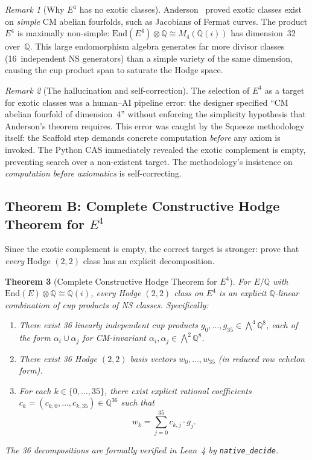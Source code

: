 \documentclass[11pt]{article}
\theoremstyle{plain}
\newtheorem{theorem}{Theorem}[section]
\theoremstyle{definition}
\theoremstyle{remark}
\newtheorem{remark}[theorem]{Remark}
\newcommand{\Q}{\mathbb{Q}}
\newcommand{\End}{\mathrm{End}}
\begin{document}
\begin{remark}[Why $E^4$ has no exotic classes]\label{rem:why-no-exotic}
Anderson~\cite{Anderson1993} proved exotic classes exist on
\emph{simple} CM abelian fourfolds, such as Jacobians of Fermat
curves.  The product $E^4$ is maximally non-simple:
$\End(E^4) \otimes \Q \cong M_4(\Q(i))$ has dimension~32 over~$\Q$.
This large endomorphism algebra generates far more divisor classes
(16~independent NS generators) than a simple variety of the same
dimension, causing the cup product span to saturate the Hodge space.
\end{remark}

\begin{remark}[The hallucination and self-correction]%
\label{rem:hallucination}
The selection of $E^4$ as a target for exotic classes was a
human--AI pipeline error: the designer specified ``CM abelian
fourfold of dimension~4'' without enforcing the simplicity
hypothesis that Anderson's theorem requires.  This error was
caught by the Squeeze methodology itself: the Scaffold step
demands concrete computation \emph{before} any axiom is invoked.
The Python CAS immediately revealed the exotic complement is
empty, preventing search over a non-existent target.  The
methodology's insistence on \emph{computation before axiomatics}
is self-correcting.
\end{remark}

\subsection{Theorem B: Complete Constructive Hodge Theorem for $E^4$}

Since the exotic complement is empty, the correct target is
stronger: prove that \emph{every} Hodge $(2,2)$ class has
an explicit decomposition.

\begin{theorem}[Complete Constructive Hodge Theorem for $E^4$]%
\label{thm:constructive-hodge}
For $E/\Q$ with $\End(E) \otimes \Q \cong \Q(i)$, every
Hodge $(2,2)$ class on $E^4$ is an explicit $\Q$-linear
combination of cup products of NS classes.  Specifically:
\begin{enumerate}[nosep]
\item There exist 36 linearly independent cup products
  $g_0, \ldots, g_{35} \in \bigwedge^4 \Q^8$, each of the
  form $\alpha_i \cup \alpha_j$ for CM-invariant
  $\alpha_i, \alpha_j \in \bigwedge^2 \Q^8$.
\item There exist 36 Hodge $(2,2)$ basis vectors
  $w_0, \ldots, w_{35}$ (in reduced row echelon form).
\item For each $k \in \{0, \ldots, 35\}$, there exist
  explicit rational coefficients
  $c_k = (c_{k,0}, \ldots, c_{k,35}) \in \Q^{36}$ such that
  \[
    w_k = \sum_{j=0}^{35} c_{k,j} \cdot g_j.
  \]
\end{enumerate}
The 36 decompositions are formally verified in Lean~4 by
\texttt{native\_decide}.
\end{theorem}
\end{document}
